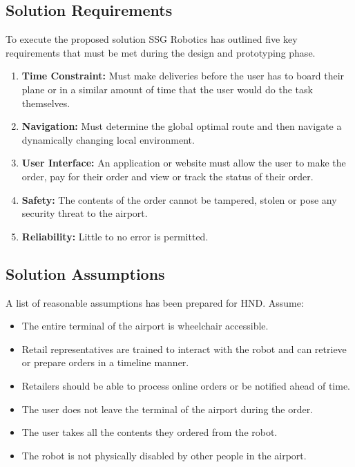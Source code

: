 \documentclass[letterpaper,fleqn,oneside]{template}
\begin{document}
\subsection{Solution Requirements}

To execute the proposed solution SSG Robotics has outlined five key requirements that must be met during the design and prototyping phase. 

\begin{enumerate}
    \item \textbf{Time Constraint:} Must make deliveries before the user has to board their plane or in a similar amount of time that the user would do the task themselves.
    \item \textbf{Navigation:} Must determine the global optimal route and then navigate a dynamically changing local environment.
    \item \textbf{User Interface:} An application or website must allow the user to make the order, pay for their order and view or track the status of their order.
    \item \textbf{Safety:} The contents of the order cannot be tampered, stolen or pose any security threat to the airport.
    \item \textbf{Reliability:} Little to no error is permitted.
\end{enumerate}

\subsection{Solution Assumptions}

A list of reasonable assumptions has been prepared for HND. Assume:
\begin{itemize}
    \item The entire terminal of the airport is wheelchair accessible.
    \item Retail representatives are trained to interact with the robot and can retrieve or prepare orders in a timeline manner. 
    \item Retailers should be able to process online orders or be notified ahead of time. 
    \item The user does not leave the terminal of the airport during the order. 
    \item The user takes all the contents they ordered from the robot. 
    \item  The robot is not physically disabled by other people in the airport. 
\end{itemize}
\end{document}
